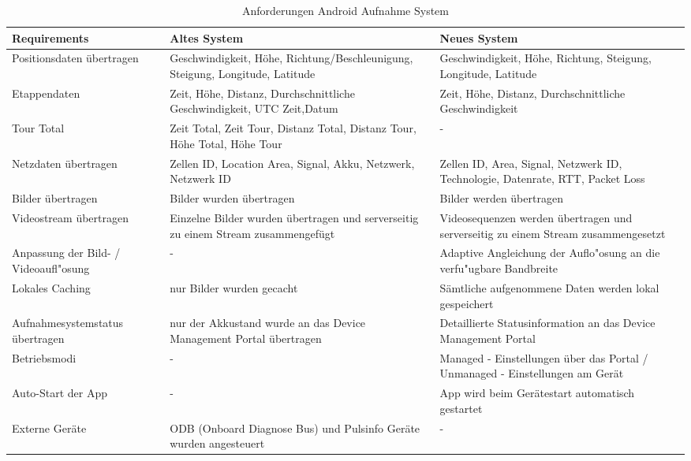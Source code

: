 \begin{table}
\begin{center}
{\renewcommand{\arraystretch}{2}%
    \begin{tabular}{ | p{5cm} | p{5cm} | p{5cm} |}
    \hline
    \textbf{Requirements} & \textbf{Altes System} & \textbf{Neues System} \\ \hline
\hline
    Positionsdaten übertragen & Geschwindigkeit, Höhe, Richtung/Beschleunigung, Steigung, Longitude, Latitude & Geschwindigkeit, Höhe, Richtung, Steigung, Longitude, Latitude \\ \hline
    Etappendaten & Zeit, Höhe, Distanz, Durchschnittliche Geschwindigkeit, UTC Zeit,Datum & Zeit, Höhe, Distanz, Durchschnittliche Geschwindigkeit \\
    \hline
     Tour Total & Zeit Total, Zeit Tour, Distanz Total, Distanz Tour, Höhe Total, Höhe Tour & - \\
    \hline
    Netzdaten übertragen & Zellen ID, Location Area, Signal, Akku, Netzwerk, Netzwerk ID & Zellen ID, Area, Signal, Netzwerk ID, Technologie, Datenrate, RTT, Packet Loss\\
    \hline
    Bilder übertragen & Bilder wurden übertragen & Bilder werden übertragen\\
    \hline
    Videostream übertragen & Einzelne Bilder wurden übertragen und serverseitig zu einem Stream zusammengefügt & Videosequenzen werden übertragen und serverseitig zu einem Stream zusammengesetzt\\
    \hline
    Anpassung der Bild- / Videoaufl"osung & - & Adaptive Angleichung der Auflo"osung an die verfu"ugbare Bandbreite\\
    \hline
    Lokales Caching & nur Bilder wurden gecacht & Sämtliche aufgenommene Daten werden lokal gespeichert\\
    \hline
	Aufnahmesystemstatus übertragen & nur der Akkustand wurde an das Device Management Portal übertragen & Detaillierte Statusinformation an das Device Management Portal\\
    \hline    
    Betriebsmodi & - & Managed - Einstellungen über das Portal / Unmanaged - Einstellungen am Gerät\\
    \hline
	Auto-Start der App & - & App wird beim Gerätestart automatisch gestartet\\
    \hline    
    Externe Geräte & ODB (Onboard Diagnose Bus) und Pulsinfo Geräte wurden angesteuert & -\\
    \hline
    
    
\end{tabular}}
\end{center}
\caption{Anforderungen Android Aufnahme System}
\end{table}


